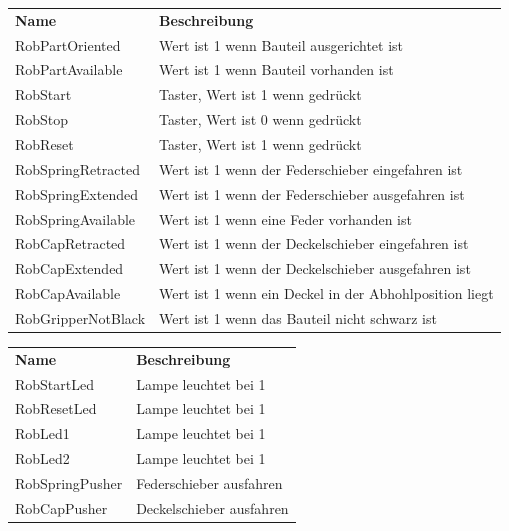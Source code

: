 \documentclass{article}
\begin{document}
\begin{center}
	\setlength\extrarowheight{4pt}
	\small
	\begin{tabularx}{\textwidth}{|p{4cm}|X|}
		\hline
		\rowcolor{tublau}
		\multicolumn{2}{|c|}{\bf \color{white} \large Sensoren}\\
		\hline\hline
		\rowcolor{gray!80}
		\bf Name & \bf Beschreibung\\
		\hline\hline
		RobPartOriented & Wert ist 1 wenn Bauteil ausgerichtet ist\\
		RobPartAvailable & Wert ist 1 wenn Bauteil vorhanden ist\\
		RobStart & Taster, Wert ist 1 wenn gedrückt\\
		RobStop & Taster, Wert ist 0 wenn gedrückt\\
		RobReset & Taster, Wert ist 1 wenn gedrückt\\
		RobSpringRetracted & Wert ist 1 wenn der Federschieber eingefahren ist\\
		RobSpringExtended & Wert ist 1 wenn der Federschieber ausgefahren ist\\
		RobSpringAvailable & Wert ist 1 wenn eine Feder vorhanden ist\\
		RobCapRetracted & Wert ist 1 wenn der Deckelschieber eingefahren ist\\
		RobCapExtended & Wert ist 1 wenn der Deckelschieber ausgefahren ist\\
		RobCapAvailable & Wert ist 1 wenn ein Deckel in der Abhohlposition liegt\\
		RobGripperNotBlack & Wert ist 1 wenn das Bauteil nicht schwarz ist\\
		\hline
	\end{tabularx}
	
	\medskip
	
	\begin{tabularx}{\textwidth}{|p{4cm}|X|}
		\hline
		\rowcolor{tublau}
		\multicolumn{2}{|c|}{\bf \color{white} \large Aktoren}\\
		\hline\hline
		\rowcolor{gray!80}
		\bf Name & \bf Beschreibung\\
		\hline\hline
		RobStartLed & Lampe leuchtet bei 1\\
		RobResetLed & Lampe leuchtet bei 1\\
		RobLed1 & Lampe leuchtet bei 1\\
		RobLed2 & Lampe leuchtet bei 1\\
		RobSpringPusher & Federschieber ausfahren\\
		RobCapPusher & Deckelschieber ausfahren\\
		\hline
	\end{tabularx}
\end{center}
\end{document}
